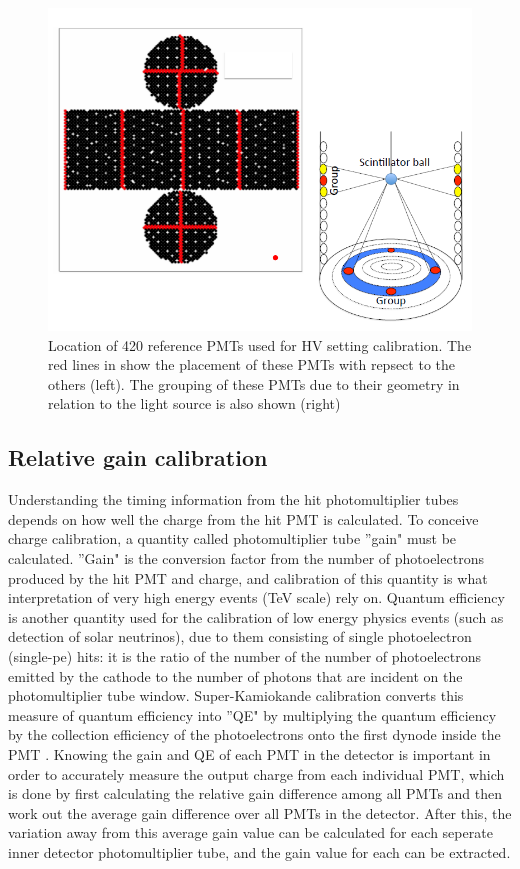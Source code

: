 \begin{figure}
    \includegraphics[width=\textwidth]{Figures/hvcalib.png}
\caption{Location of 420 reference PMTs used for HV setting calibration. The red lines in show the placement of these PMTs with repsect to the others (left). The grouping of these PMTs due to their geometry in relation to the light source is also shown (right) }
    \label{fig:hvcalib}
\end{figure}




\subsection{Relative gain calibration}

Understanding the timing information from the hit photomultiplier tubes depends on how well the charge from the hit PMT is calculated. To conceive charge calibration, a quantity called photomultiplier tube ''gain" must be calculated. ''Gain" is the conversion factor from the number of photoelectrons produced by the hit PMT and charge, and calibration of this quantity is what interpretation of very high energy events (TeV scale) rely on. Quantum efficiency is another quantity used for the calibration of low energy physics events (such as detection of solar neutrinos), due to them consisting of single photoelectron (single-pe) hits: it is the ratio of the number of the number of photoelectrons emitted by the cathode to the number of photons that are incident on the photomultiplier tube window. Super-Kamiokande calibration converts this measure of quantum efficiency into ''QE" by multiplying the quantum efficiency by the collection efficiency of the photoelectrons onto the first dynode inside the PMT \cite{abe_calibration_2014}. Knowing the gain and QE of each PMT in the detector is important in order to accurately measure the output charge from each individual PMT, which is done by first calculating the relative gain difference among all PMTs and then work out the average gain difference over all PMTs in the detector. After this, the variation away from this average gain value can be calculated for each seperate inner detector photomultiplier tube, and the gain value for each can be extracted. 

